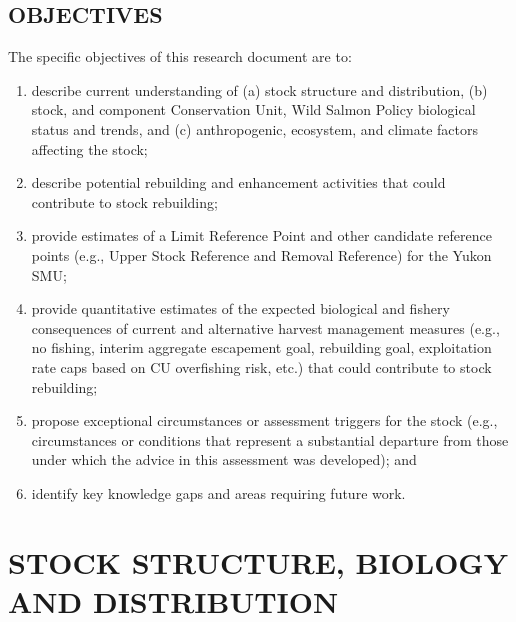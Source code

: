 \documentclass[11pt]{book}
\begin{document}
\hypertarget{objectives}{%
\subsection{OBJECTIVES}\label{objectives}}

The specific objectives of this research document are to:
\begin{enumerate}
\def\labelenumi{\arabic{enumi}.}
\item
  describe current understanding of (a) stock structure and distribution, (b) stock, and component Conservation Unit, Wild Salmon Policy biological status and trends, and (c) anthropogenic, ecosystem, and climate factors affecting the stock;
\item
  describe potential rebuilding and enhancement activities that could contribute to stock rebuilding;
\item
  provide estimates of a Limit Reference Point and other candidate reference points (e.g., Upper Stock Reference and Removal Reference) for the Yukon SMU;
\item
  provide quantitative estimates of the expected biological and fishery consequences of current and alternative harvest management measures (e.g., no fishing, interim aggregate escapement goal, rebuilding goal, exploitation rate caps based on CU overfishing risk, etc.) that could contribute to stock rebuilding;
\item
  propose exceptional circumstances or assessment triggers for the stock (e.g., circumstances or conditions that represent a substantial departure from those under which the advice in this assessment was developed); and
\item
  identify key knowledge gaps and areas requiring future work.
\end{enumerate}
\hypertarget{sec:stock}{%
\section{STOCK STRUCTURE, BIOLOGY AND DISTRIBUTION}\label{sec:stock}}
\end{document}

